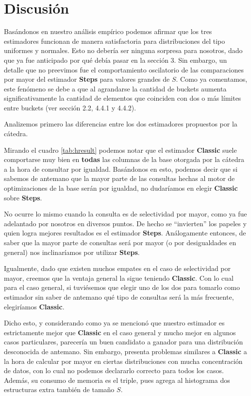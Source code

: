 \section{Discusión}
Basándonos en nuestro análisis empírico podemos afirmar que los tres estimadores funcionan de manera satisfactoria para distribuciones del tipo uniformes y normales. Esto no debería ser ninguna sorpresa para nosotros, dado que ya fue anticipado por qué debía pasar en la sección 3. Sin embargo, un detalle que no preevimos fue el comportamiento oscilatorio de las comparaciones por mayor del estimador \textbf{Steps} para valores grandes de $S$. Como ya comentamos, este fenómeno se debe a que al agrandarse la cantidad de buckets aumenta significativamente la cantidad de elementos que coinciden con dos o más límites entre buckets (ver sección 2.2, 4.4.1 y 4.4.2).

Analizemos primero las diferencias entre los dos estimadores propuestos por la cátedra.

Mirando el cuadro \ref{tab:hresult} podemos notar que el estimador \textbf{Classic} suele comportarse muy bien en \textbf{todas} las columnas de la base otorgada por la cátedra a la hora de consultar por igualdad. Basándonos en esto, podemos decir que si sabemos de antemano que la mayor parte de las consultas hechas al motor de optimizaciones de la base serán por igualdad, no dudaríamos en elegir \textbf{Classic} sobre \textbf{Steps}.

No ocurre lo mismo cuando la consulta es de selectividad por mayor, como ya fue adelantado por nosotros en diversos puntos. De hecho se ``invierten'' los papeles y quien logra mejores resultados es el estimador \textbf{Steps}. Análogamente entonces, de saber que la mayor parte de consultas será por mayor (o por desigualdades en general) nos inclinaríamos por utilizar \textbf{Steps}.

Igualmente, dado que existen muchos empates en el caso de selectividad por mayor, creemos que la ventaja general la sigue teniendo \textbf{Classic}. Con lo cual para el caso general, si tuviésemos que elegir uno de los dos para tomarlo como estimador sin saber de antemano qué tipo de consultas será la más frecuente, elegiríamos \textbf{Classic}.

Dicho esto, y considerando como ya se mencionó que nuestro estimador es estrictamente mejor que \textbf{Classic} en el caso general y mucho mejor en algunos casos particulares, parecería un buen candidato a ganador para una distribución desconocida de antemano. Sin embargo, presenta problemas similares a \textbf{Classic} a la hora de calcular por mayor en ciertas distribuciones con mucha concentración de datos, con lo cual no podemos declararlo correcto para todos los casos. Además, su consumo de memoria es el triple, pues agrega al histograma dos estructuras extra también de tamaño $S$.

